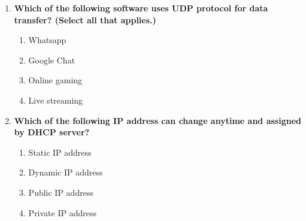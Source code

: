 \begin{flushleft}
\begin{enumerate}
		\item \textbf{Which of the following software uses UDP protocol for data transfer? (Select all that applies.)}
		\begin{enumerate}[label=(\alph*)]
			\item Whatsapp 
			\item Google Chat
			\item Online gaming   %
			\item Live streaming  %
		\end{enumerate}
		\bigskip
		\bigskip	

		\item \textbf{Which of the following IP address can change anytime and assigned by DHCP server?}
		\begin{enumerate}[label=(\alph*)]
			\item Static IP address
			\item Dynamic IP address %
			\item Public IP address
			\item Private IP address
		\end{enumerate}
		\bigskip
		\bigskip		
		
		
		
	\end{enumerate}
\end{flushleft}

\newpage

